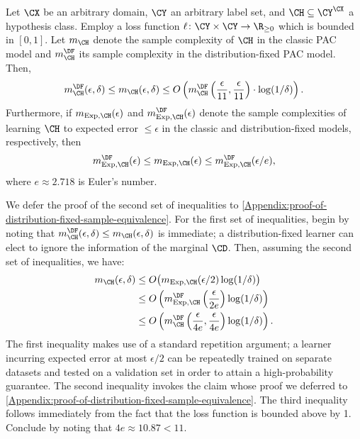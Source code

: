 \documentclass[11pt]{article}
\begin{document}
\begin{theorem}\label{Theorem:distribution-fixed-sample-equivalence}
Let $\CX$ be an \linebreak arbitrary domain, $\CY$ an arbitrary label set, and $\CH \subseteq \CY^\CX$ a hypothesis class. Employ a loss function $\ell \colon \CY \times \CY \to \R_{\geq 0}$ which is bounded in $[0, 1]$. Let $m_{\CH}$ denote the sample complexity of  $\CH$ in the classic PAC model and $m_{\CH}^{\DF}$ its sample complexity in the distribution-fixed PAC model. Then,
\[ m_{\CH}^{\DF}(\epsilon, \delta) \leq m_{\CH}(\epsilon, \delta) \leq O\left( m_{\CH}^{\DF} \left(\frac{\epsilon}{11}, \frac{\epsilon}{11} \right) \cdot \log(1 / \delta) \right). \]
Furthermore, if $m_{\Exp, \CH}(\epsilon)$ and $m_{\Exp, \CH}^{\DF}(\epsilon)$ denote the sample complexities of learning $\CH$ to expected error $\leq \epsilon$ in the classic and distribution-fixed models, respectively, then 
\[ m_{\Exp, \CH}^{\DF}(\epsilon) \leq m_{\Exp, \CH}(\epsilon) \leq m_{\Exp, \CH}^{\DF}(\epsilon / e), \]
where $e \approx 2.718$ is Euler's number. 
\end{theorem}
\begin{proofsketch}
We defer the proof of the second set of inequalities to \cref{Appendix:proof-of-distribution-fixed-sample-equivalence}. For the first set of inequalities, begin by noting that $m_{\CH}^{\DF}(\epsilon, \delta) \leq m_{\CH}(\epsilon, \delta)$ is immediate; a distribution-fixed learner can elect to ignore the information of the marginal $\CD$. Then, assuming the second set of inequalities, we have: 
\begin{align*}
m_\CH(\epsilon, \delta) &\leq O\big( m_{\Exp, \CH}(\epsilon / 2) \log(1 / \delta) \big) \\
&\leq O\left( m_{\Exp, \CH}^{\DF} \left(\frac{\epsilon}{ 2e}\right) \log(1 / \delta) \right) \\
&\leq O\left( m_{\CH}^{\DF} \left(\frac{\epsilon}{4e}, \frac{\epsilon}{4e} \right) \log(1 / \delta) \right). 
\end{align*}
The first inequality makes use of a standard repetition argument; a learner incurring expected error at most $\epsilon / 2$ can be repeatedly trained on separate datasets and tested on a validation set in order to attain a high-probability guarantee. The second inequality invokes the claim whose proof we deferred to \cref{Appendix:proof-of-distribution-fixed-sample-equivalence}. The third inequality follows immediately from the fact that the loss function is bounded above by 1. Conclude by noting that $4e \approx 10.87 < 11$. 
\end{proofsketch}
\end{document}
